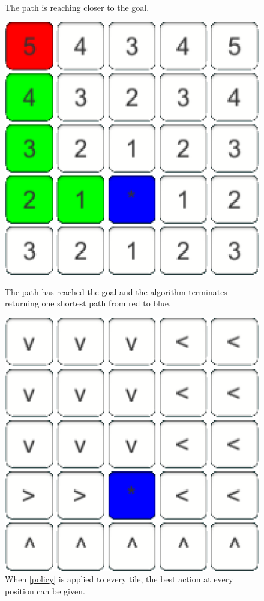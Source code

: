 \documentclass[conference]{IEEEtran}
\begin{document}
\begin{figure}[h]
\begin{minipage}[t]{0.3\linewidth}
\caption{The path is reaching closer to the goal.}
\end{minipage}
\hfill
\begin{minipage}[t]{0.3\linewidth}
\centering
\includegraphics[width=1\textwidth]{images/FindingPolicy/05.png}
\caption{The path has reached the goal and the algorithm terminates returning one shortest path from red to blue.}
\end{minipage}
\hfill
\begin{minipage}[t]{0.3\linewidth}
\centering
\includegraphics[width=1\textwidth]{images/FindingPolicy/policy.png}
\caption{When \ref{policy} is applied to every tile, the best action at every position can be given.}
\end{minipage}
\end{figure}
\end{document}
